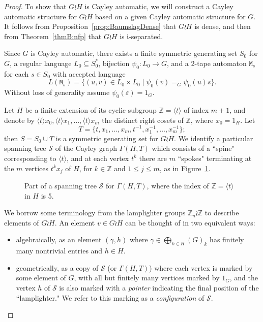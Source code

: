 \documentclass[11pt]{amsart}
\theoremstyle{definition}
\newcommand\Z{\mathbb Z}
\newcommand\h{x}
\newcommand{\ii}{\mathfrak{i}}
\begin{document}
\begin{proof}
To show that $G \wr H$ is Cayley automatic, we will construct a  Cayley automatic structure for $G\wr H$ based on a given Cayley automatic structure for $G$.
It follows from Proposition~\ref{prop:BaumslagDense} that $G \wr H$ is dense, and then from Theorem~\ref{thmB:nfp}
that $G\wr H$ is $\ii$-separated.



Since $G$ is Cayley automatic, there exists a finite symmetric generating set $S_0$ for $G$, a regular language  $L_0 \subseteq S_0^{*}$,  bijection $\psi_0\colon L_0\to G$, and a 2-tape automaton $\texttt{M}_s$  for each $s\in S_0$ with accepted language $$L(\texttt{M}_s)=\{(u,v)\in L_0\times L_0\mid \psi_0(v)=_G \psi_0(u)s\}.$$
Without loss of generality assume $\psi_0(\varepsilon)=1_G$.


Let $H$ be a finite extension of its cyclic subgroup $\mathbb{Z} = \langle t \rangle$ of index $m+1$,
and denote by $ \langle t \rangle \h_0,  \langle t \rangle \h_1, \dots, \langle t \rangle \h_m$ the
distinct  right cosets of $\Z$, where $\h_0 =1_H$.
Let $$T = \{t, \h_1,\dots,\h_m, t^{-1}, \h_1^{-1}, \dots, \h_m^{-1}\};$$
then  $S = S_0 \cup T$ is a symmetric generating set for $G\wr H$.
We identify a particular spanning tree $\mathcal S$ of the Cayley graph $\Gamma(H,T)$ which consists of a ``spine" corresponding to $\langle t \rangle$, and at each vertex $t^k$  there are $m$ ``spokes" terminating at the $m$ vertices $t^kx_j$ of $H$, for $k\in \Z$ and  $1\leq j\leq m$, as in Figure~\ref{fig:spinespine}.

\begin{figure}[h!]
  \centering
  
 \caption{Part of a spanning tree $\mathcal S$ for $\Gamma(H,T)$, where the index of $\Z=\langle t\rangle$ in $H$ is 5.}
 \label{fig:spinespine}
 \end{figure}



We borrow some terminology from the lamplighter groups $\Z_n \wr \Z$ to describe elements of $G \wr H$.
An element $v \in G \wr H$ can be thought of in two equivalent ways:
\begin{itemize}
    \item algebraically, as an element $(\gamma,h)$ where $\gamma \in \bigoplus_{k \in H} (G)_k$ has finitely many nontrivial entries and $h \in H$.
    \item geometrically, as a copy of $\mathcal S$ (or $ \Gamma(H,T)$) where each vertex is marked by some element of $G$, with all but finitely many  vertices marked by $1_G$, and the vertex $h$ of $\mathcal S$ is also marked with a {\em pointer} indicating the final position of the ``lamplighter." We refer to this marking  as a {\em configuration} of ${\mathcal S}$.
\end{itemize}


\end{proof}
\end{document}
